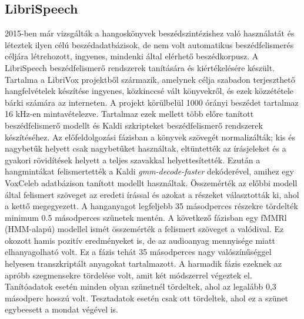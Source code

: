 \subsection{LibriSpeech}

2015-ben már vizsgálták a hangoskönyvek beszédszintézishez való használatát és léteztek ilyen célú beszédadatbázisok, de nem volt automatikus beszédfelismerés céljára létrehozott, ingyenes, mindenki által elérhető beszédkorpusz. A LibriSpeech beszédfelismerő rendszerek tanítására és kiértékelésére készült. Tartalma a LibriVox projektből származik, amelynek célja szabadon terjeszthető hangfelvételek készítése ingyenes, közkinccsé vált könyvekről, és ezek közzététele bárki számára az interneten.
\newline
\newline
A projekt körülbelül 1000 órányi beszédet tartalmaz 16 kHz-en mintavételezve. Tartalmaz ezek mellett több előre tanított beszédfelismerő modellt és Kaldi szkripteket beszédfelismerő rendszerek készítéséhez.
\newline
\newline
Az előfeldolgozási fázisban a könyvek szövegét normalizálták; kis és nagybetűk helyett csak nagybetűket használtak, eltüntették az írásjeleket és a gyakori rövidítések helyett a teljes szavakkal helyettesítették. Ezután a hangmintákat felismertették a Kaldi \emph{gmm-decode-faster} dekóderével, amihez egy VoxCeleb adatbázison tanított modellt használtak.
\newline
\newline
Összemérték az előbbi modell által felismert szöveget az eredeti írással és azokat a részeket választották ki, ahol a kettő megegyezett. A hanganyagot legfeljebb 35 másodperces részekre tördelték minimum 0.5 másodperces szünetek mentén.
\newline
\newline
A következő fázisban egy fMMRl (HMM-alapú) modellel ismét összemérték a felismert szöveget a valódival. Ez okozott hamis pozitív eredményeket is, de az audioanyag mennyisége miatt elhanyagolható volt. Ez a fázis tehát 35 másodperces nagy valószínűséggel helyesen transzkriptált anyagokat tartalmazott.
\newline
\newline
A harmadik fázis ezeknek az apróbb szegmensekre tördelése volt, amit két módszerrel végeztek el. Tanítóadatok esetén minden olyan szünetnél tördeltek, ahol az legalább 0,3 másodperc hosszú volt. Tesztadatok esetén csak ott tördeltek, ahol ez a szünet egybeesett a mondat végével is.

